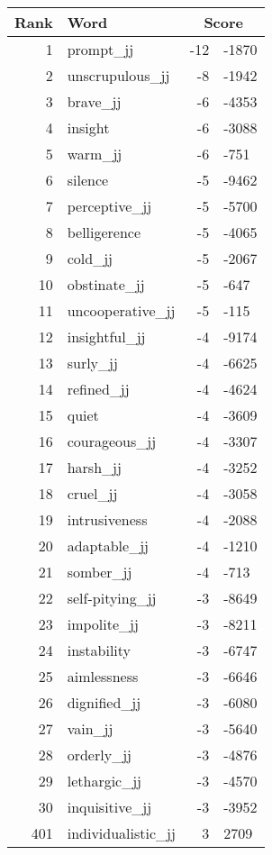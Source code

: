\begin{longtable}[!htbp]{| rlr@{.}l |}
    \hline
    \textbf{Rank} & \textbf{Word} & \multicolumn{2}{c|}{\textbf{Score}} \\
    \hline
    \endhead
    1 & prompt\_jj & -12 & -1870 \\
    2 & unscrupulous\_jj & -8 & -1942 \\
    3 & brave\_jj & -6 & -4353 \\
    4 & insight & -6 & -3088 \\
    5 & warm\_jj & -6 & -751 \\
    6 & silence & -5 & -9462 \\
    7 & perceptive\_jj & -5 & -5700 \\
    8 & belligerence & -5 & -4065 \\
    9 & cold\_jj & -5 & -2067 \\
    10 & obstinate\_jj & -5 & -647 \\
    11 & uncooperative\_jj & -5 & -115 \\
    12 & insightful\_jj & -4 & -9174 \\
    13 & surly\_jj & -4 & -6625 \\
    14 & refined\_jj & -4 & -4624 \\
    15 & quiet & -4 & -3609 \\
    16 & courageous\_jj & -4 & -3307 \\
    17 & harsh\_jj & -4 & -3252 \\
    18 & cruel\_jj & -4 & -3058 \\
    19 & intrusiveness & -4 & -2088 \\
    20 & adaptable\_jj & -4 & -1210 \\
    21 & somber\_jj & -4 & -713 \\
    22 & self-pitying\_jj & -3 & -8649 \\
    23 & impolite\_jj & -3 & -8211 \\
    24 & instability & -3 & -6747 \\
    25 & aimlessness & -3 & -6646 \\
    26 & dignified\_jj & -3 & -6080 \\
    27 & vain\_jj & -3 & -5640 \\
    28 & orderly\_jj & -3 & -4876 \\
    29 & lethargic\_jj & -3 & -4570 \\
    30 & inquisitive\_jj & -3 & -3952 \\
    401 & individualistic\_jj & 3 & 2709 \\

\end{longtable}
